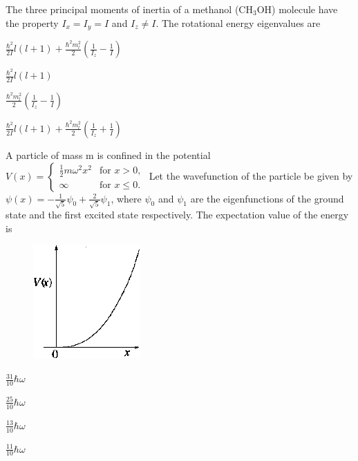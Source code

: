 \documentclass{exam}
\begin{document}
\begin{questions}
\question The three principal moments of inertia of a methanol (CH$_3$OH) molecule have the property $I_x = I_y = I$ and $I_z \neq I$. The rotational energy eigenvalues are\hfill{}

\begin{enumerate} \begin{multicols}{4}
	\item $\frac{\hbar^{2}}{2I}l(l+1)+\frac{\hbar^{2}m_{l}^{2}}{2}(\frac{1}{I_{z}}-\frac{1}{I})$
	\item $\frac{\hbar^{2}}{2I}l(l+1)$
	\item $\frac{\hbar^{2}m_{l}^{2}}{2}(\frac{1}{I_{z}}-\frac{1}{I})$
	\item $\frac{\hbar^{2}}{2I}l(l+1)+\frac{\hbar^{2}m_{l}^{2}}{2}(\frac{1}{I_{z}}+\frac{1}{I})$
\end{multicols} \end{enumerate}

\question A particle of mass m is confined in the potential $V(x)=\begin{cases} \frac{1}{2}m\omega^{2}x^{2} & \text{for } x>0, \\ \infty & \text{for } x \le 0. \end{cases}$
	Let the wavefunction of the particle be given by $\psi(x)=-\frac{1}{\sqrt{5}}\psi_{0}+\frac{2}{\sqrt{5}}\psi_{1}$, where $\psi_0$ and $\psi_1$ are the eigenfunctions of the ground state and the first excited state respectively. The expectation value of the energy is\hfill{}
	\begin{figure}[H] \centering
		\caption*{} \label{35} \includegraphics[width=0.2\columnwidth]{pics/35.png}
	\end{figure}


\begin{enumerate} \begin{multicols}{4}
	\item $\frac{31}{10}\hbar\omega$ \item $\frac{25}{10}\hbar\omega$ \item $\frac{13}{10}\hbar\omega$ \item $\frac{11}{10}\hbar\omega$
\end{multicols} \end{enumerate}


\end{questions}
\end{document}
